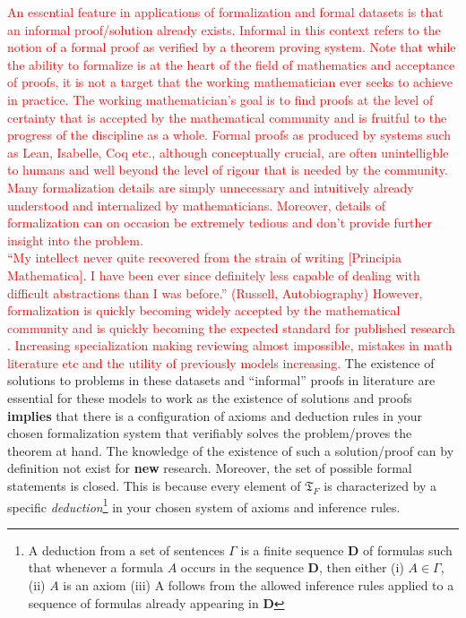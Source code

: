 \begin{definition}
\textcolor{red}{
An essential feature in applications of formalization and formal datasets is that an informal proof/solution already exists. Informal in this context refers to the notion of a formal proof as verified by a theorem proving system. Note that while the ability to formalize is at the heart of the field of mathematics and acceptance of proofs,
it is not a target that the working mathematician ever seeks to achieve in practice. The working mathematician's goal is to find proofs at the level of certainty that is accepted by the mathematical community and is fruitful to the progress of the discipline as a whole. Formal proofs as produced by systems such as Lean, Isabelle, Coq etc., although conceptually crucial, are often unintelligble to humans and well beyond the level of rigour that is needed by the community. Many formalization details are simply unnecessary and
intuitively already understood and internalized by mathematicians. Moreover, details of formalization can on occasion be extremely tedious and don't provide further insight into the problem.
\\
“My intellect never quite recovered from the strain of
writing [Principia Mathematica]. I have been ever since
definitely less capable of dealing with difficult
abstractions than I was before.” (Russell, Autobiography)
However, formalization is quickly becoming widely accepted by the mathematical community and is quickly becoming the expected standard for published research \cite{Tao, formalization_projects_to_check_shit}.
Increasing specialization making reviewing almost impossible, mistakes in math literature etc and the utility of previously models increasing.
}
The existence of solutions to problems in these datasets and ``informal'' proofs in literature are essential for these models to work as the existence of solutions and proofs \textbf{implies} that there is a configuration of axioms and deduction rules in your chosen formalization system that verifiably solves the problem/proves the theorem at hand.
The knowledge of the existence of such a solution/proof can by definition not exist for \textbf{new} research. Moreover, the set of possible formal statements is closed. This is because every element of $\mathfrak{T}_F$ is characterized by a specific \textit{deduction}\footnote[1]{A deduction from a set of sentences $\Gamma$ is a finite sequence \textbf{D} of formulas such that whenever a formula $A$ occurs in the sequence \textbf{D}, then either (i) $A\in\Gamma$, (ii) $A$ is an axiom (iii) A follows from the allowed inference rules applied to a sequence of formulas already appearing in \textbf{D}} in your chosen system of axioms and inference rules. 

\end{definition}
